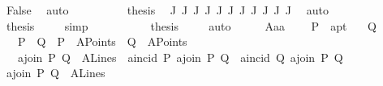\begin{isabellebody}
\ False\ \isamarkupfalse%
\ auto\isanewline
\ \ \ \ \ \ \ \ \isamarkupfalse%
\ {\isacharquery}{\kern0pt}thesis\ \isamarkupfalse%
\ J{}\ J{}\ J{}\ J{}\ J{}\ J{}\ J{}\ J{}\ J{}\ J{}{}\ J{}{}\ \isamarkupfalse%
\ auto\isanewline
\ \ \ \ \ \ \isamarkupfalse%
\isanewline
\ \ \ \ \ \ \isamarkupfalse%
\ {}{\isacharcolon}{\kern0pt}{\isacharquery}{\kern0pt}thesis\ \isamarkupfalse%
\ {}\ \isamarkupfalse%
\ simp\isanewline
\ \ \ \ \isamarkupfalse%
\isanewline
\ \ \ \ \isamarkupfalse%
\ {\isacharquery}{\kern0pt}thesis\ \isamarkupfalse%
\ {}\ \isamarkupfalse%
\ auto\isanewline
\ \ \isamarkupfalse%
%
\endisatagproof
{\isafoldproof}%
%
\isadelimproof
\ \isanewline
%
\endisadelimproof
\isanewline
{}\isamarkupfalse%
\ A{}{\isacharunderscore}{\kern0pt}a{}a{\isacharcolon}{\kern0pt}\ \isanewline
\ \ \ P\ {\isacharcolon}{\kern0pt}{\isacharcolon}{\kern0pt}\ a{}pt\isanewline
\ \ \ Q\isanewline
\ \ \ {\isachardoublequoteopen}P\ {\isasymnoteq}\ Q{\isachardoublequoteclose}\ \ {\isachardoublequoteopen}P\ {\isasymin}\ A{}Points{\isachardoublequoteclose}\ \ {\isachardoublequoteopen}Q\ {\isasymin}\ A{}Points{\isachardoublequoteclose}\isanewline
\ \ \ {\isachardoublequoteopen}a{}join\ P\ Q\ {\isasymin}\ A{}Lines{\isachardoublequoteclose}\ \ {\isachardoublequoteopen}a{}incid\ P\ {\isacharparenleft}{\kern0pt}a{}join\ P\ Q{\isacharparenright}{\kern0pt}{\isachardoublequoteclose}\ \ {\isachardoublequoteopen}a{}incid\ Q\ {\isacharparenleft}{\kern0pt}a{}join\ P\ Q{\isacharparenright}{\kern0pt}{\isachardoublequoteclose}\isanewline
%
\isadelimproof
%
\endisadelimproof
%
\isatagproof
{}\isamarkupfalse%
\ {\isacharminus}{\kern0pt}\isanewline
\ \ \isamarkupfalse%
\ {\isachardoublequoteopen}a{}join\ P\ Q\ {\isasymin}\ A{}Lines{\isachardoublequoteclose}\ \isamarkupfalse%

\end{isabellebody}

